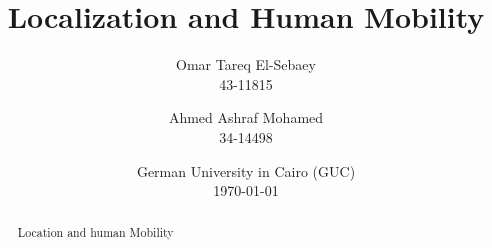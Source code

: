 \documentclass[11pt, a4paper, english]{report}
\title{Localization and Human Mobility}
\author{Omar Tareq El-Sebaey \\ 43-11815 \and Ahmed Ashraf Mohamed \\ 34-14498}
\date{German University in Cairo (GUC) \\ \today}
\begin{document}
    \begin{titlepage}
        \maketitle
        \begin{abstract}
            Location and human Mobility
        \end{abstract}
        \tableofcontents
    \end{titlepage}
    
    
    
    
\end{document}
